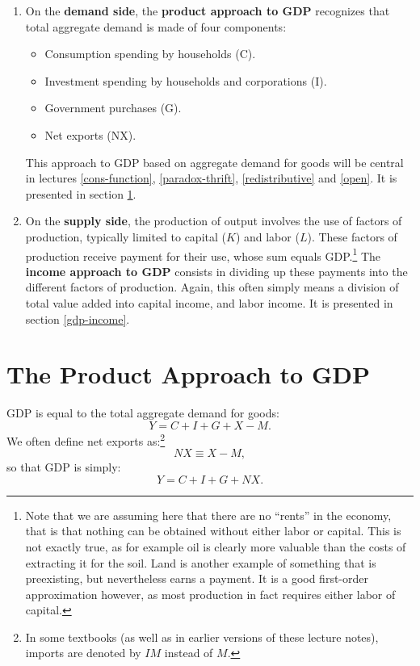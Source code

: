 \documentclass[]{book}
\providecommand{\tightlist}{%
  \setlength{\itemsep}{0pt}\setlength{\parskip}{0pt}}
\let\rmarkdownfootnote\footnote%
\def\footnote{\protect\rmarkdownfootnote}
\begin{document}
\begin{enumerate}
\def\labelenumi{\arabic{enumi}.}
\item
  On the \textbf{demand side}, the \textbf{product approach to GDP}
  recognizes that total aggregate demand is made of four components:

  \begin{itemize}
  \tightlist
  \item
    Consumption spending by households (C).
  \item
    Investment spending by households and corporations (I).
  \item
    Government purchases (G).
  \item
    Net exports (NX).
  \end{itemize}

  This approach to GDP based on aggregate demand for goods will be
  central in lectures \ref{cons-function}, \ref{paradox-thrift},
  \ref{redistributive} and \ref{open}. It is presented in section
  \ref{gdp-product}.
\item
  On the \textbf{supply side}, the production of output involves the use
  of factors of production, typically limited to capital (\(K\)) and
  labor (\(L\)). These factors of production receive payment for their
  use, whose sum equals GDP.\footnote{Note that we are assuming here
    that there are no ``rents'' in the economy, that is that nothing can
    be obtained without either labor or capital. This is not exactly
    true, as for example oil is clearly more valuable than the costs of
    extracting it for the soil. Land is another example of something
    that is preexisting, but nevertheless earns a payment. It is a good
    first-order approximation however, as most production in fact
    requires either labor of capital.} The \textbf{income approach to
  GDP} consists in dividing up these payments into the different factors
  of production. Again, this often simply means a division of total
  value added into capital income, and labor income. It is presented in
  section \ref{gdp-income}.
\end{enumerate}

\section{The Product Approach to GDP}\label{gdp-product}

GDP is equal to the total aggregate demand for goods:
\[ Y = C + I + G + X -M.\] We often define net exports as:\footnote{In
  some textbooks (as well as in earlier versions of these lecture
  notes), imports are denoted by \(IM\) instead of \(M\).}
\[NX \equiv X-M,\] so that GDP is simply: \[ Y = C + I + G + NX.\]
\end{document}
